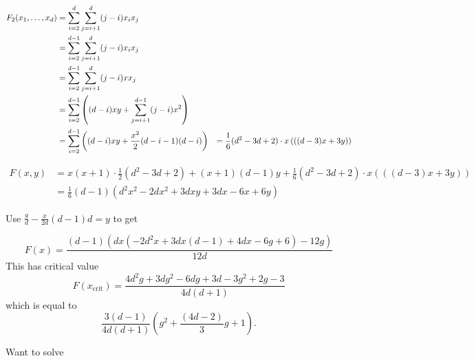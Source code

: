 \documentclass[11pt]{article}
\begin{document}
\begin{align*}
    F_2(x_1, \dots, x_{d}) &= \sum\limits_{i = 2}^d\limits\sum\limits_{j=i+1}^d (j - i) x_i x_j \\
    &= \sum\limits_{i = 2}^{d-1}\limits\sum\limits_{j=i+1}^d (j - i) x_i x_j \\
    &= \sum\limits_{i = 2}^{d-1}\limits\sum\limits_{j=i+1}^d (j - i) x x_j \\
    &= \sum\limits_{i = 2}^{d-1}\left( (d-i)xy + \sum\limits_{j=i+1}^{d-1}(j - i) x^2\right)\\
    &= \sum\limits_{i = 2}^{d-1}\left( (d-i)xy + \frac{x^2}{2}(d-i-1)(d-i)\right)
    &= \frac{1}{6}(d^2 - 3d + 2) \cdot x \left( ((d - 3)x + 3y) \right)
\end{align*}

\begin{align*}
    F(x, y) &= x(x+1) \cdot \frac{1}{2}(d^2 - 3d + 2) + (x+1)(d - 1)y +  \frac{1}{6}(d^2 - 3d + 2) \cdot x \left( ((d - 3)x + 3y) \right) \\
    &= \frac{1}{6}(d - 1)\left(d^2x^2 - 2dx^2 + 3dxy + 3dx - 6x + 6y\right)
\end{align*}

Use \(\frac{g}{d} - \frac{x}{2d}(d-1)d = y\) to get

\[F(x) = \frac{(d - 1) \left( dx \left(-2d^2 x + 3dx(d - 1) + 4dx - 6g + 6 \right) - 12g \right)}{12d}
\]
This has critical value \[F(x_{\text{crit}}) = \frac{4d^2g + 3dg^2 - 6dg + 3d - 3g^2 + 2g - 3}{4d(d + 1)}
\] which is equal to \[\frac{3(d - 1)}{4d(d+1)}\left(g^2 + \frac{(4d - 2)}{3}g + 1\right).
\]

Want to solve
\end{document}
